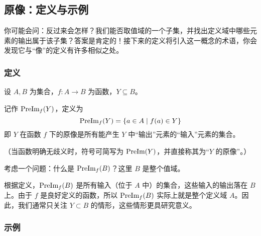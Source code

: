 
\subsection{原像：定义与示例}

你可能会问：反过来会怎样？我们能否取值域的一个子集，并找出定义域中哪些元素的输出属于该子集？答案是肯定的！接下来的定义将引入这一概念的术语，你会发现它与``像''的定义有许多相似之处。

\subsubsection*{定义}

\begin{definition}
    设 $A, B$ 为集合，$f:A \to B$ 为函数，$Y \subseteq B$。

    记作 $\text{PreIm}_f(Y)$，定义为
    \[\text{PreIm}_f (Y) = \{a \in A \mid f(a) \in Y \}\]
    即 $Y$ 在函数 $f$ 下的原像是所有能产生 $Y$ 中``输出''元素的``输入''元素的集合。

    （当函数明确无歧义时，符号可简写为 $\text{PreIm}(Y)$，并直接称其为``$Y$ 的原像''。）
\end{definition}

考虑一个问题：什么是 $\text{PreIm}_f (B)$？这里 $B$ 是整个值域。

根据定义，$\text{PreIm}_f (B)$ 是所有输入（位于 $A$ 中）的集合，这些输入的输出落在 $B$ 上。由于 $f$ 是良好定义的函数，所以 $\text{PreIm}_f (B)$ 实际上就是整个定义域 $A$。因此，我们通常只关注 $Y \subset B$ 的情形，这些情形更具研究意义。

\subsubsection*{示例}

